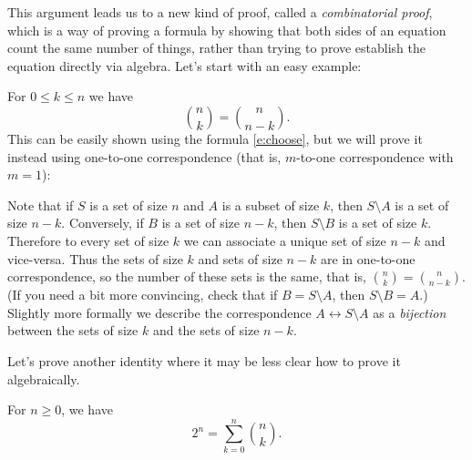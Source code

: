 \documentclass[11pt,dvipsnames]{book}
\numberwithin{figure}{section} %
\numberwithin{table}{section} %
\begin{document}

\medskip
This argument leads us to a new kind of proof, called a {\it combinatorial proof}, which is a way of proving a formula by showing that both sides of an equation count the same number of things, rather than trying to prove establish the equation directly via algebra. Let's start with an easy example:

\begin{example}
For $0 \leq k \leq n$ we have
\[
{n\choose k} = {n \choose n-k}.
\]
This can be easily shown using the formula \eqref{e:choose}, but we will prove it instead using one-to-one correspondence (that is, $m$-to-one correspondence with $m=1$):

Note that if $S$ is a set of size $n$ and $A$ is a subset of size $k$, then $S\setminus A$ is a set of size $n-k$. Conversely, if $B$ is a set of size $n-k$, then $S \setminus B$ is a set of size $k$.
Therefore to every set of size $k$ we can associate a unique set of size $n-k$ and vice-versa. Thus the sets of size $k$ and sets of size $n-k$ are in one-to-one correspondence, so the number of these sets is the same, that is, ${n\choose k} = {n \choose n-k}$.
(If you need a bit more convincing, check that if
$B = S \setminus A$, then $S \setminus B = A$.) Slightly more formally we describe the correspondence $A \leftrightarrow S \setminus A$ as a {\em bijection} between the sets of size $k$ and the sets of size $n-k$.

\end{example}

Let's prove another identity where it may be less clear how to prove it algebraically.

\begin{corollary}
\label{c:2^n=nk}
For $n\geq 0$, we have
\[
2^{n} = \sum_{k=0}^{n} {n\choose k}
.\]
\end{corollary}
\end{document}
